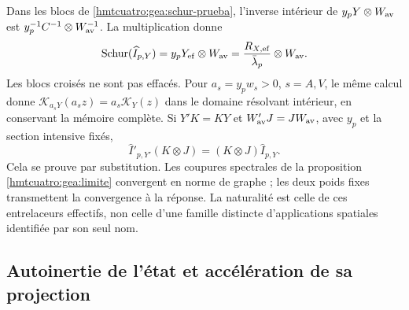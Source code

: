 Dans les blocs de \eqref{hmtcuatro:gea:schur-prueba}, l’inverse intérieur de $y_pY\otimes W_{\rm av}$ est $y_p^{-1}C^{-1}\otimes W_{\rm av}^{-1}$. La multiplication donne
\begin{equation}
\operatorname{Schur}(\widehat I_{p,Y})
=y_pY_{\rm ef}\otimes W_{\rm av}
=\frac{R_{X,\rm ef}}{\bar\lambda_p}\otimes W_{\rm av}.
\label{hmtcuatro:gea:schur-autoinercia}
\end{equation}
Les blocs croisés ne sont pas effacés. Pour $a_s=y_pw_s>0$, $s=A,V$, le même calcul donne $\mathcal K_{a_sY}(a_sz)=a_s\mathcal K_Y(z)$ dans le domaine résolvant intérieur, en conservant la mémoire complète. Si $Y'K=KY$ et $W'_{\rm av}J=JW_{\rm av}$, avec $y_p$ et la section intensive fixés,
\begin{equation}
\widehat I'_{p,Y'}(K\otimes J)
=(K\otimes J)\widehat I_{p,Y}.
\label{hmtcuatro:gea:naturalidad}
\end{equation}
Cela se prouve par substitution. Les coupures spectrales de la proposition \ref{hmtcuatro:gea:limite} convergent en norme de graphe ; les deux poids fixes transmettent la convergence à la réponse. La naturalité est celle de ces entrelaceurs effectifs, non celle d’une famille distincte d’applications spatiales identifiée par son seul nom.

\subsection{Autoinertie de l’état et accélération de sa projection}
\label{hmtcuatro:gea:proyeccion}

